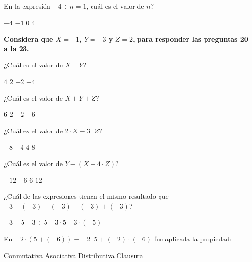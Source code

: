 \documentclass[spanish,letterpaper, 12pt, addpoints, answers]{exam}
\begin{document}
\begin{questions}
    \question[1] En la expresión $-4\div n=1$, cuál es el valor de $n$?
    \begin{choices}
        \CorrectChoice $-4$
        \choice $-1$
        \choice $0$
        \choice $4$
    \end{choices}
    \vspace{0.15in}
    \vspace{1cm}
    \parbox{5in}{\textbf{Considera que $X=-1$, $Y=-3$ y $Z=2$, para responder las preguntas 20 a la 23.}}
    \vspace{0.5cm}

    \question[1] ¿Cuál es el valor de $X-Y$?
    \begin{choices}
        \choice $4$
        \CorrectChoice $2$
        \choice $-2$
        \choice $-4$
    \end{choices}
    \vspace{0.15in}

    \question[1] ¿Cuál es el valor de $X+Y+Z$?
    \begin{choices}
        \choice $6$
        \choice $2$
        \CorrectChoice $-2$
        \choice $-6$
    \end{choices}
    \vspace{0.15in}

    \newpage
    \question[1] ¿Cuál es el valor de $2\cdot X-3\cdot Z$?
    \begin{choices}
        \CorrectChoice $-8$
        \choice $-4$
        \choice $4$
        \choice $8$
    \end{choices}
    \vspace{0.15in}

    \question[1] ¿Cuál es el valor de $Y-(X-4\cdot Z)$?
    \begin{choices}
        \choice $-12$
        \choice $-6$
        \CorrectChoice $6$
        \choice $12$
    \end{choices}
    \vspace{0.15in}

    \question[1] ¿Cuál de las expresiones tienen el mismo resultado que $-3+(-3)+(-3)+(-3)+(-3)$?
    \begin{choices}
        \choice $-3+5$
        \choice $-3\div 5$
        \CorrectChoice $-3\cdot 5$
        \choice $-3\cdot (-5)$
    \end{choices}
    \vspace{0.15in}

    \question[1] En $-2\cdot (5+(-6))=-2\cdot 5+(-2)\cdot (-6)$ fue aplicada la propiedad:
    \begin{choices}
        \choice Conmutativa
        \choice Asociativa
        \CorrectChoice Distributiva
        \choice Clausura
    \end{choices}
    \vspace{0.15in}


\end{questions}
\end{document}
